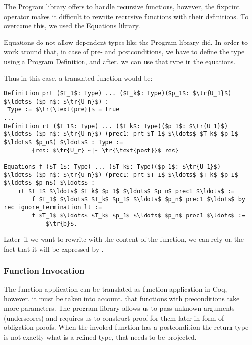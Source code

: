 The Program library offers  to handle recursive functions, however, the fixpoint operator makes it difficult to rewrite recursive functions with their definitions. To overcome this, we used the Equations library. 

Equations do not allow dependent types like the Program library did. In order to work around that, in case of pre- and postconditions, we have to define the type using a Program Definition, and after, we can use that type in the equations.

Thus in this case, a translated function would be:

\begin{lstlisting}[style=myCoqstyle]  
Definition prt ($T_1$: Type) ... ($T_k$: Type)($p_1$: $\tr{U_1}$) $\ldots$ ($p_n$: $\tr{U_n}$) :
 Type := $\tr{\text{pre}}$ = true
...
Definition rt ($T_1$: Type) ... ($T_k$: Type)($p_1$: $\tr{U_1}$) $\ldots$ ($p_n$: $\tr{U_n}$) (prec1: prt $T_1$ $\ldots$ $T_k$ $p_1$ $\ldots$ $p_n$) $\ldots$ : Type :=
		{res: $\tr{U_r} ~|~ \tr{\text{post}}$ res}

Equations f ($T_1$: Type) ... ($T_k$: Type)($p_1$: $\tr{U_1}$) $\ldots$ ($p_n$: $\tr{U_n}$) (prec1: prt $T_1$ $\ldots$ $T_k$ $p_1$ $\ldots$ $p_n$) $\ldots$ : 
	rt $T_1$ $\ldots$ $T_k$ $p_1$ $\ldots$ $p_n$ prec1 $\ldots$ :=
		f $T_1$ $\ldots$ $T_k$ $p_1$ $\ldots$ $p_n$ prec1 $\ldots$ by rec ignore_termination lt :=
		f $T_1$ $\ldots$ $T_k$ $p_1$ $\ldots$ $p_n$ prec1 $\ldots$ :=
			$\tr{b}$.
\end{lstlisting}

Later, if we want to rewrite with the content of the function, we can rely on the fact that it will be expressed by .

\subsubsection{Function Invocation}

The function application can be translated as function application in Coq, however, it must be taken into account, that functions with preconditions take more parameters. The program library allows us to pass unknown arguments (underscores) and requires us to construct proof for them later in form of obligation proofs. When the invoked function has a postcondition the return type is not exactly what is a refined type, that needs to be projected.
